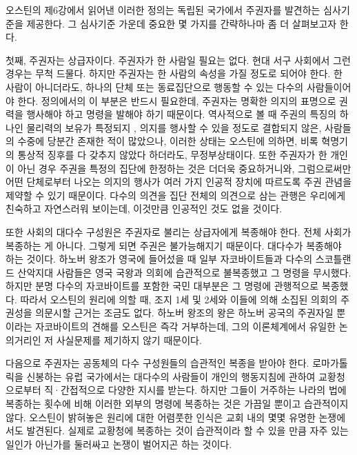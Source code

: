 오스틴의 제6강에서 읽어낸 이러한 정의는 독립된 국가에서 주권자를 발견하는
심사기준을 제공한다.
그 심사기준 가운데 중요한 몇 가지를 간략하나마 좀 더 살펴보고자 한다.

첫째, 주권자는  상급자이다.
주권자가 한 사람일 필요는 없다.
현대 서구 사회에서 그런 경우는 무척 드물다.
하지만 주권자는 한 사람의 속성을 가질 정도로 되어야 한다.
한 사람이 아니더라도,
하나의 단체 또는 동료집단으로 행동할 수 있는 다수의 사람들이어야 한다.
정의에서의 이 부분은 반드시 필요한데,
주권자는 명확한 의지의 표명으로
권력을 행사해야 하고 명령을 발해야 하기 때문이다.
역사적으로 볼 때
주권의 특징의 하나인 물리력의 보유가
특정되지 , 의지를 행사할 수 있을 정도로 결합되지 않은,
사람들의 수중에 당분간 존재한 적이 많았으나,
이러한 상태는 오스틴에 의하면, 비록 혁명기의 통상적 징후를 다 갖추지
않았다 하더라도, 무정부상태이다.
또한
주권자가 한 개인이 아닌 경우 주권을 특정의 집단에 한정하는 것은
더더욱 중요하거니와,
그럼으로써만 어떤 단체로부터 나오는 의지의 행사가 여러 가지 인공적 장치에
따르도록 주권 관념을 제약할 수 있기 때문이다.
다수의 의견을 집단 전체의 의견으로 삼는 관행은 우리에게 친숙하고 자연스러워
보이는데, 이것만큼 인공적인 것도 없을 것이다.

또한 사회의 대다수 구성원은 주권자로 불리는 상급자에게 복종해야 한다.
전체 사회가 복종하는 게 아니다. 그렇게 되면 주권은 불가능해지기 때문이다.
대다수가 복종해야 하는 것이다.
하노버 왕조가 영국에 들어섰을 때
일부 자코바이트들과
다수의 스코틀랜드 산악지대 사람들은
영국 국왕과 의회에 습관적으로 불복종했고 그 명령을 무시했다.
하지만 분명 다수의 자코바이트를 포함한 국민 대부분은 그 명령에 관행적으로
복종했다.
따라서 오스틴의 원리에 의할 때,
조지 1세 및 2세와 이들에 의해 소집된 의회의 주권성을 의문시할
근거는 조금도 없다.
하노버 왕조의 왕은 하노버 공국의 주권자일 뿐이라는
자코바이트의 견해를 오스틴은 즉각 거부하는데,
그의 이론체계에서 유일한 논의거리인 저 사실문제를 제기하지 않기 때문이다.

다음으로
주권자는 공동체의 다수 구성원들의 습관적인 복종을 받아야 한다.
로마가톨릭을 신봉하는 유럽 국가에서는 대다수의 사람들이
개인의 행동지침에 관하여
교황청으로부터
직·간접적으로 다양한 지시를 받는다.
하지만 그들이 거주하는 나라의 법에 복종하는 횟수에 비해
이러한 외부의 명령에 복종하는 것은 가끔일 뿐이고 습관적이지 않다.
오스틴이 밝혀놓은 원리에 대한 어렴풋한 인식은
교회 내의 몇몇 유명한 논쟁에서도 발견된다.
실제로 교황청에 복종하는 것이
습관적이라 할 수 있을 만큼 자주 있는 일인가 아닌가를 둘러싸고 논쟁이
벌어지곤 하는 것이다.

